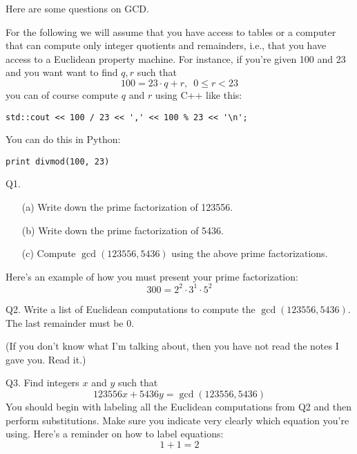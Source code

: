 \documentclass[a4paper,12pt]{article}
\begin{document}
\newpage

Here are some questions on GCD.

For the following we will assume that you have access to tables or a 
computer that can compute only integer quotients and remainders, 
i.e., that you have access to a Euclidean property machine.
For instance, if you're given 100 and 23 and you want want to find $q,r$
such that
\[
100 = 23 \cdot q + r, \,\,\, 0 \leq r < 23
\]
you can of course compute $q$ and $r$ using C++ like this:
\begin{Verbatim}[frame=single]
std::cout << 100 / 23 << ',' << 100 % 23 << '\n';
\end{Verbatim}
You can do this in Python:
\begin{Verbatim}[frame=single]
print divmod(100, 23)
\end{Verbatim}

\newpage

Q1. \mbox{}
\begin{enumerate}[topsep=0in]
\item[(a)] Write down the prime factorization of 123556.
\item[(b)] Write down the prime factorization of 5436.
\item[(c)] Compute $\gcd(123556, 5436)$ using the above prime factorizations.
\end{enumerate}

Here's an example of how you must present your prime factorization:
\[
300 = 2^2 \cdot 3^1 \cdot 5^2
\]

\SOLUTION




\newpage

Q2. 
Write a list of Euclidean computations to compute the 
$\gcd(123556, 5436)$.
The last remainder must be 0.

(If you don't know what I'm talking about, then you have not read
the notes I gave you. Read it.)

\SOLUTION



\newpage




Q3.
Find integers $x$ and $y$ such that 
\[
123556x + 5436y = \gcd(123556, 5436)
\]
You should begin with labeling all the Euclidean computations
from Q2 and then perform substitutions.
Make sure you indicate very clearly which equation you're using.
Here's a reminder on how to label equations:
\[
1 + 1 = 2 \tag{1}
\]

\SOLUTION
\end{document}
